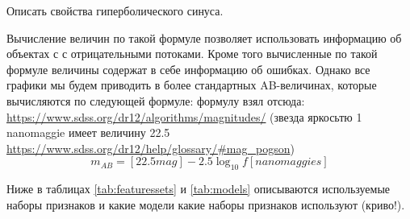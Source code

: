 \documentclass[fleqn,usenatbib]{mnras}
\begin{document}
Описать свойства гиперболического синуса.

Вычисление величин по такой формуле позволяет использовать информацию об объектах с с отрицательными потоками. Кроме того вычисленные по такой формуле величины содержат в себе информацию об ошибках. Однако все графики мы будем приводить в более стандартных AB-величинах, которые вычисляются по следующей формуле: формулу взял отсюда: \url{https://www.sdss.org/dr12/algorithms/magnitudes/} (звезда яркосьтю 1 nanomaggie имеет величину 22.5 \url{https://www.sdss.org/dr12/help/glossary/#mag_pogson})
\begin{equation}\label{eq:mag_ab}
    m_{AB} = [22.5 mag] - 2.5 \log_{10} f [nanomaggies]
\end{equation}

Ниже в таблицах \ref{tab:featuressets} и \ref{tab:models} описываются используемые наборы признаков и какие модели какие наборы признаков используют (криво!). 
\end{document}
